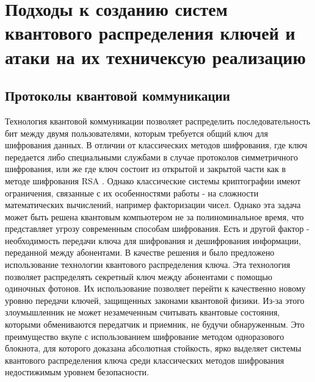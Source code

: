 \chapter{Подходы к созданию систем квантового распределения ключей и атаки на их техничексую реализацию}\label{ch:ch1}
\renewcommand{\thefigure}{1.\arabic{figure}} %
\setcounter{figure}{0}                     %
\renewcommand{\figurename}{Рисунок}

\section{Протоколы квантовой коммуникации}\label{sec:ch1/sect2}
Технология квантовой коммуникации позволяет распределить последовательность бит между двумя пользователями,  которым требуется общий ключ для шифрования данных. В отличии от классических методов шифрования, где ключ передается либо специальными службами в случае протоколов симметричного шифрования, или же где ключ состоит из открытой и закрытой части как в методе шифрования RSA \cite{hamza2020}. Однако классические системы криптографии имеют ограничения, связанные с их особенностями работы - на сложности математических  вычислений, например факторизации чисел. \cite{rybalov2023} Однако эта задача может быть решена квантовым компьютером не за полиноминальное время, что представляет угрозу современным способам шифрования. \cite{gouzien2021}  Есть и другой фактор - необходимость передачи ключа для шифрования и дешифрования информации, переданной между абонентами. 
В качестве решения и было предложено использование технологии квантового распределения ключа. Эта технология позволяет распределять секретный ключ между абонентами с помощью одиночных фотонов. Их использование позволяет перейти к качественно новому уровню передачи ключей, защищенных законами квантовой физики. Из-за этого злоумышленник не может незамеченным считывать квантовые состояния, которыми обмениваются передатчик и приемник, не будучи обнаруженным. Это преимущество вкупе с использованием шифрование методом одноразового блокнота, для которого доказана абсолютная стойкость, ярко выделяет системы квантового распределения ключа среди классических методов шифрования недостижимым уровнем безопасности. \cite{ekert1991}


